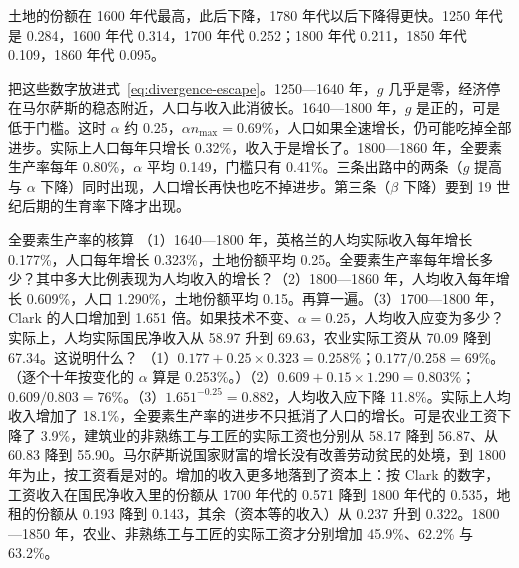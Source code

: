土地的份额在 1600 年代最高，此后下降，1780 年代以后下降得更快。1250 年代是 0.284，1600 年代 0.314，1700 年代 0.252；1800 年代 0.211，1850 年代 0.109，1860 年代 0.095。

把这些数字放进式~\eqref{eq:divergence-escape}。1250—1640 年，$g$ 几乎是零，经济停在马尔萨斯的稳态附近，人口与收入此消彼长。1640—1800 年，$g$ 是正的，可是低于门槛。这时 $\alpha$ 约 0.25，$\alpha n_{\max}=0.69\%$，人口如果全速增长，仍可能吃掉全部进步。实际上人口每年只增长 0.32\%，收入于是增长了。1800—1860 年，全要素生产率每年 0.80\%，$\alpha$ 平均 0.149，门槛只有 0.41\%。三条出路中的两条（$g$ 提高与 $\alpha$ 下降）同时出现，人口增长再快也吃不掉进步。第三条（$\beta$ 下降）要到 19 世纪后期的生育率下降才出现。

\begin{example}{全要素生产率的核算}\label{ex:divergence-tfp}
（1）1640—1800 年，英格兰的人均实际收入每年增长 0.177\%，人口每年增长 0.323\%，土地份额平均 0.25。全要素生产率每年增长多少？其中多大比例表现为人均收入的增长？（2）1800—1860 年，人均收入每年增长 0.609\%，人口 1.290\%，土地份额平均 0.15。再算一遍。（3）1700—1800 年，Clark 的人口增加到 1.651 倍。如果技术不变、$\alpha=0.25$，人均收入应变为多少？实际上，人均实际国民净收入从 58.97 升到 69.63，农业实际工资从 70.09 降到 67.34。这说明什么？
\solution （1）$0.177+0.25\times0.323=0.258\%$；$0.177/0.258=69\%$。（逐个十年按变化的 $\alpha$ 算是 0.253\%。）（2）$0.609+0.15\times1.290=0.803\%$；$0.609/0.803=76\%$。（3）$1.651^{-0.25}=0.882$，人均收入应下降 11.8\%。实际上人均收入增加了 18.1\%，全要素生产率的进步不只抵消了人口的增长。可是农业工资下降了 3.9\%，建筑业的非熟练工与工匠的实际工资也分别从 58.17 降到 56.87、从 60.83 降到 55.90。马尔萨斯说国家财富的增长没有改善劳动贫民的处境，到 1800 年为止，按工资看是对的。增加的收入更多地落到了资本上：按 Clark 的数字，工资收入在国民净收入里的份额从 1700 年代的 0.571 降到 1800 年代的 0.535，地租的份额从 0.193 降到 0.143，其余（资本等的收入）从 0.237 升到 0.322。1800—1850 年，农业、非熟练工与工匠的实际工资才分别增加 45.9\%、62.2\% 与 63.2\%。
\end{example}


